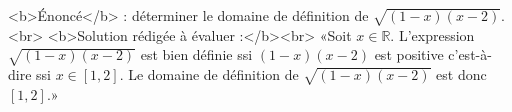 <b>Énoncé</b> : déterminer le domaine de définition de $\sqrt{(1-x)(x-2)}$.<br> <b>Solution rédigée à évaluer :</b><br>  «Soit $x\in\mathbb{R}$.  L'expression $\sqrt{(1-x)(x-2)}$ est bien définie ssi $(1-x)(x-2)$ est positive c'est-à-dire ssi $x\in[1,2]$. Le domaine de définition de $\sqrt{(1-x)(x-2)}$ est donc $[1,2]$.»

\begin{reponses}
\end{reponses}

